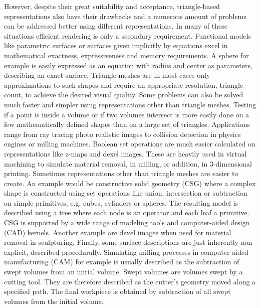 However, despite their great suitability and acceptance, triangle-based representations also have their drawbacks and a numerous amount of problems can be addressed better using different representations. %
In many of these situations efficient rendering is only a secondary requirement.
Functional models like parametric surfaces or surfaces given implicitly by equations excel in mathematical exactness, expressiveness and memory requirements.
A sphere for example is easily expressed as an equation with radius and center as parameters, describing an exact surface.
Triangle meshes are in most cases only approximations to such shapes and require an appropriate resolution, \ie triangle count, to achieve the desired visual quality.
%
Some problems can also be solved much faster and simpler using representations other than triangle meshes.
Testing if a point is inside a volume or if two volumes intersect is more easily done on a few mathematically defined shapes than on a large set of triangles.
Applications range from ray tracing photo realistic images to collision detection in physics engines or milling machines.
Boolean set operations are much easier calculated on representations like z-maps and dexel images.
These are heavily used in virtual machining to simulate material removal, \eg in milling, or addition, \eg in 3-dimensional printing.
%
Sometimes representations other than triangle meshes are easier to create.
An example would be constructive solid geometry (CSG) where a complex shape is constructed using set operations like union, intersection or subtraction on simple primitives, e.g. cubes, cylinders or spheres.
The resulting model is described using a tree where each node is an operator and each leaf a primitive.
CSG is supported by a wide range of modeling tools and computer-aided design (CAD) kernels.
Another example are dexel images when used for material removal in sculpturing.
%
Finally, some surface descriptions are just inherently non-explicit, \eg described procedurally.
Simulating milling processes in computer-aided manufacturing (CAM) for example is usually described as the subtraction of swept volumes from an initial volume.
Swept volumes are volumes swept by a cutting tool. They are therefore described as the cutter's geometry moved along a specified path.
The final workpiece is obtained by subtraction of all swept volumes from the initial volume.


